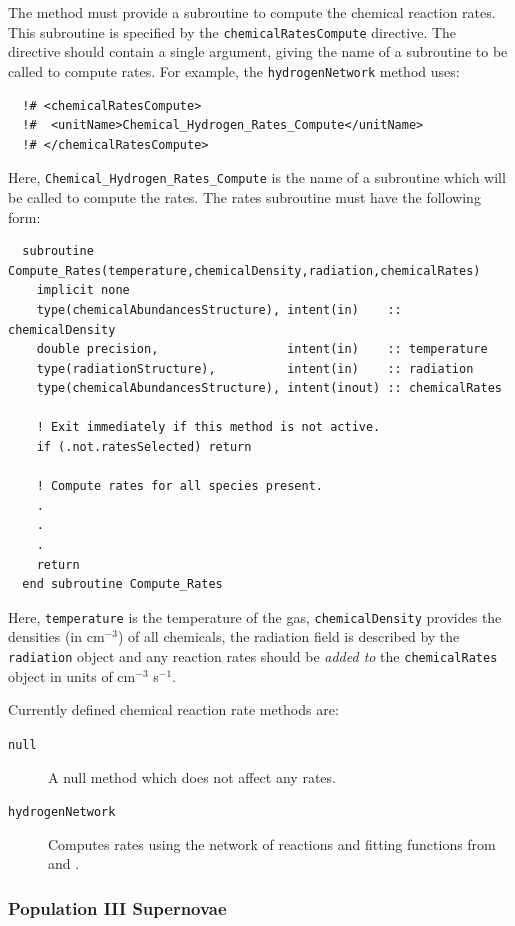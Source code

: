 The method must provide a subroutine to compute the chemical reaction rates. This subroutine is specified by the {\tt chemicalRatesCompute} directive. The directive should contain a single argument, giving the name of a subroutine to be called to compute rates. For example, the {\tt hydrogenNetwork} method uses:
\begin{verbatim}
  !# <chemicalRatesCompute>
  !#  <unitName>Chemical_Hydrogen_Rates_Compute</unitName>
  !# </chemicalRatesCompute> 
\end{verbatim}
Here, {\tt Chemical\_Hydrogen\_Rates\_Compute} is the name of a subroutine which will be called to compute the rates. The rates subroutine must have the following form:
\begin{verbatim}
  subroutine Compute_Rates(temperature,chemicalDensity,radiation,chemicalRates)
    implicit none
    type(chemicalAbundancesStructure), intent(in)    :: chemicalDensity
    double precision,                  intent(in)    :: temperature
    type(radiationStructure),          intent(in)    :: radiation
    type(chemicalAbundancesStructure), intent(inout) :: chemicalRates

    ! Exit immediately if this method is not active.
    if (.not.ratesSelected) return

    ! Compute rates for all species present.
    .
    .
    .
    return
  end subroutine Compute_Rates
\end{verbatim}
Here, {\tt temperature} is the temperature of the gas, {\tt chemicalDensity} provides the densities (in cm$^{-3}$) of all chemicals, the radiation field is described by the {\tt radiation} object and any reaction rates should be \emph{added to} the {\tt chemicalRates} object in units of cm$^{-3}$ s$^{-1}$.

Currently defined chemical reaction rate methods are:
\begin{description}
 \item [{\tt null}] A null method which does not affect any rates.
 \item [{\tt hydrogenNetwork}] Computes rates using the network of reactions and fitting functions from \cite{abel_modeling_1997} and \cite{tegmark_small_1997}.
\end{description}

\subsubsection{Population III Supernovae}

